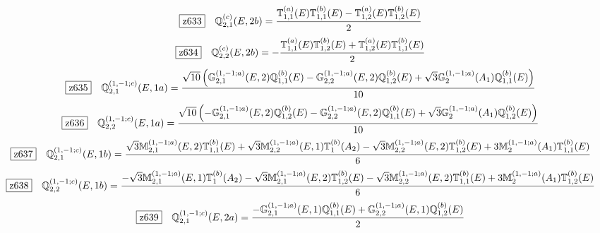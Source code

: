 \documentclass[fleqn,10pt,landscape]{jsarticle}
\begin{document}
\begin{dmath*}
\hspace*{3mm}\fbox{z633}\quad \mathbb{Q}_{2,1}^{(c)}(E,2b)=\frac{\mathbb{T}_{1,1}^{(a)}(E) \mathbb{T}_{1,1}^{(b)}(E) - \mathbb{T}_{1,2}^{(a)}(E) \mathbb{T}_{1,2}^{(b)}(E)}{2}
\end{dmath*}
\begin{dmath*}
\hspace*{3mm}\fbox{z634}\quad \mathbb{Q}_{2,2}^{(c)}(E,2b)=- \frac{\mathbb{T}_{1,1}^{(a)}(E) \mathbb{T}_{1,2}^{(b)}(E) + \mathbb{T}_{1,2}^{(a)}(E) \mathbb{T}_{1,1}^{(b)}(E)}{2}
\end{dmath*}
\begin{dmath*}
\hspace*{3mm}\fbox{z635}\quad \mathbb{Q}_{2,1}^{(1,-1;c)}(E,1a)=\frac{\sqrt{10} \left(\mathbb{G}_{2,1}^{(1,-1;a)}(E,2) \mathbb{Q}_{1,1}^{(b)}(E) - \mathbb{G}_{2,2}^{(1,-1;a)}(E,2) \mathbb{Q}_{1,2}^{(b)}(E) + \sqrt{3} \mathbb{G}_{2}^{(1,-1;a)}(A_{1}) \mathbb{Q}_{1,1}^{(b)}(E)\right)}{10}
\end{dmath*}
\begin{dmath*}
\hspace*{3mm}\fbox{z636}\quad \mathbb{Q}_{2,2}^{(1,-1;c)}(E,1a)=\frac{\sqrt{10} \left(- \mathbb{G}_{2,1}^{(1,-1;a)}(E,2) \mathbb{Q}_{1,2}^{(b)}(E) - \mathbb{G}_{2,2}^{(1,-1;a)}(E,2) \mathbb{Q}_{1,1}^{(b)}(E) + \sqrt{3} \mathbb{G}_{2}^{(1,-1;a)}(A_{1}) \mathbb{Q}_{1,2}^{(b)}(E)\right)}{10}
\end{dmath*}
\begin{dmath*}
\hspace*{3mm}\fbox{z637}\quad \mathbb{Q}_{2,1}^{(1,-1;c)}(E,1b)=\frac{\sqrt{3} \mathbb{M}_{2,1}^{(1,-1;a)}(E,2) \mathbb{T}_{1,1}^{(b)}(E) + \sqrt{3} \mathbb{M}_{2,2}^{(1,-1;a)}(E,1) \mathbb{T}_{1}^{(b)}(A_{2}) - \sqrt{3} \mathbb{M}_{2,2}^{(1,-1;a)}(E,2) \mathbb{T}_{1,2}^{(b)}(E) + 3 \mathbb{M}_{2}^{(1,-1;a)}(A_{1}) \mathbb{T}_{1,1}^{(b)}(E)}{6}
\end{dmath*}
\begin{dmath*}
\hspace*{3mm}\fbox{z638}\quad \mathbb{Q}_{2,2}^{(1,-1;c)}(E,1b)=\frac{- \sqrt{3} \mathbb{M}_{2,1}^{(1,-1;a)}(E,1) \mathbb{T}_{1}^{(b)}(A_{2}) - \sqrt{3} \mathbb{M}_{2,1}^{(1,-1;a)}(E,2) \mathbb{T}_{1,2}^{(b)}(E) - \sqrt{3} \mathbb{M}_{2,2}^{(1,-1;a)}(E,2) \mathbb{T}_{1,1}^{(b)}(E) + 3 \mathbb{M}_{2}^{(1,-1;a)}(A_{1}) \mathbb{T}_{1,2}^{(b)}(E)}{6}
\end{dmath*}
\begin{dmath*}
\hspace*{3mm}\fbox{z639}\quad \mathbb{Q}_{2,1}^{(1,-1;c)}(E,2a)=\frac{- \mathbb{G}_{2,1}^{(1,-1;a)}(E,1) \mathbb{Q}_{1,1}^{(b)}(E) + \mathbb{G}_{2,2}^{(1,-1;a)}(E,1) \mathbb{Q}_{1,2}^{(b)}(E)}{2}
\end{dmath*}
\end{document}
